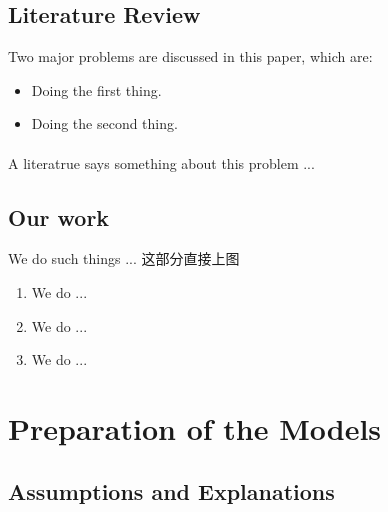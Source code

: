 \documentclass[12pt]{ctexart}
\newcommand{\upcite}[1]{\textsuperscript{\textsuperscript{\cite{#1}}}}%
\begin{document}
\subsection{Literature Review} %
Two major problems are discussed in this paper, which are:
\begin{itemize}
	\item Doing the first thing.
	\item Doing the second thing.
\end{itemize}
A literatrue\upcite{kopka2003guide} says something about this problem ...



\subsection{Our work}%
We do such things ...
这部分直接上图

\begin{enumerate}[\bfseries 1.]
	\item We do ...
	\item We do ...
	\item We do ...
\end{enumerate}
\section{Preparation of the Models}
\subsection{Assumptions and Explanations}
\end{document}
